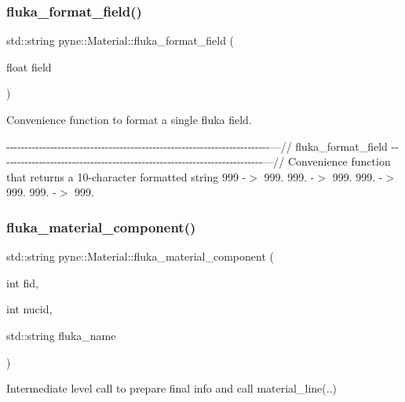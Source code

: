 \subsubsection{\texorpdfstring{fluka\+\_\+format\+\_\+field()}{fluka\_format\_field()}}
{\footnotesize\ttfamily std\+::string pyne\+::\+Material\+::fluka\+\_\+format\+\_\+field (\begin{DoxyParamCaption}\item[{float}]{field }\end{DoxyParamCaption})}



Convenience function to format a single fluka field. 

-\/-\/-\/-\/-\/-\/-\/-\/-\/-\/-\/-\/-\/-\/-\/-\/-\/-\/-\/-\/-\/-\/-\/-\/-\/-\/-\/-\/-\/-\/-\/-\/-\/-\/-\/-\/-\/-\/-\/-\/-\/-\/-\/-\/-\/-\/-\/-\/-\/-\/-\/-\/-\/-\/-\/-\/-\/-\/-\/-\/-\/-\/-\/-\/-\/-\/-\/-\/-\/-\/-\/-\/---// fluka\+\_\+format\+\_\+field -\/-\/-\/-\/-\/-\/-\/-\/-\/-\/-\/-\/-\/-\/-\/-\/-\/-\/-\/-\/-\/-\/-\/-\/-\/-\/-\/-\/-\/-\/-\/-\/-\/-\/-\/-\/-\/-\/-\/-\/-\/-\/-\/-\/-\/-\/-\/-\/-\/-\/-\/-\/-\/-\/-\/-\/-\/-\/-\/-\/-\/-\/-\/-\/-\/-\/-\/-\/-\/-\/-\/-\/---// Convenience function that returns a 10-\/character formatted string 999 -\/$>$ 999. 999. -\/$>$ 999. 999. -\/$>$ 999. 999. -\/$>$ 999. \mbox{\label{classpyne_1_1_material_a3b7bc2f7ca3f2c05860004ea27ebcadb}} 
\subsubsection{\texorpdfstring{fluka\+\_\+material\+\_\+component()}{fluka\_material\_component()}}
{\footnotesize\ttfamily std\+::string pyne\+::\+Material\+::fluka\+\_\+material\+\_\+component (\begin{DoxyParamCaption}\item[{int}]{fid,  }\item[{int}]{nucid,  }\item[{std\+::string}]{fluka\+\_\+name }\end{DoxyParamCaption})}



Intermediate level call to prepare final info and call material\+\_\+line(..) 

